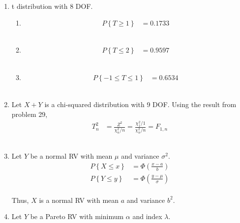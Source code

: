 \begin{enumerate}
	
	\item t distribution with 8 DOF.\\
			
		\begin{enumerate}
			\item \begin{align}
				P \left\{ T \geq 1 \right\} &= 0.1733
			\end{align}\\
			
			\item \begin{align}
				P \left\{ T \leq 2 \right\} &= 0.9597
			\end{align}\\
			
			\item \begin{align}
				P \left\{-1 \leq T \leq 1 \right\} &= 0.6534
			\end{align}\\
			
		\end{enumerate}
	
	
	\item Let $ X + Y $ is a chi-squared distribution with 9 DOF. Using the result from problem 29,\\
			
		\begin{align}
			T^2_n &= \frac{Z^2}{\chi_n^{2} / n} = \frac{\chi_1^{2} / 1}{\chi_n^{2} / n} = F_{1, n}
		\end{align}\\
	
	
	\item Let $ Y $ be a normal RV with mean $ \mu $ and variance $ \sigma^2 $.\\
			
		\begin{align}
			P\left\{X \leq x\right\} &= \Phi\left(\frac{x-a}{b}\right) \nonumber \\
			P\left\{Y \leq y\right\} &= \Phi\left(\frac{y-\mu}{\sigma}\right) 
		\end{align}\\
		Thus, $ X $ is a normal RV with mean $ a $ and variance $ b^2 $.\\
	
	
	\item Let $ Y $ be a Pareto RV with minimum $ \alpha $ and index $ \lambda $.\\
			

\end{enumerate}
